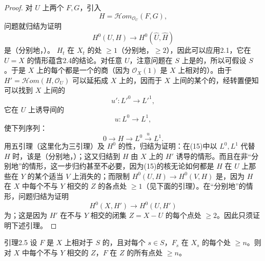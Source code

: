 \begin{proof}
对 $U$ 上两个 $F,G$，引入
\[
 H=\mathcal Hom_{\mathcal O_U}(F,G),
\]
问题就归结为证明
\[
 H^0(U,H)\longrightarrow H^0(\widehat U,\widehat H)\tag{15}
\]
是（分别地，）。 $H_t$ 在 $X_t$ 的处 $\geq1$（分别地，$\geq2$），因此可以应用2.1，它在 $U=X$ 的情形蕴含2.4的结论。对任意 $U$，注意问题在 $S$ 上是的，所以可假设 $S$ 。于是 $X$ 上的每个都是一个的商（因为 $\mathcal O_X(1)$ 是 $X$ 上相对的）。由于 $H'=\mathcal Hom(H,\mathcal O_U)$ 可以延拓成 $X$ 上的，因而于 $X$ 上间的某个的，经转置便知可以找到 $X$ 上间的
\[
 u':L'^0\longrightarrow L'^1,
\]
它在 $U$ 上诱导间的
\[
 u:L^0\longrightarrow L^1,
\]
使下列序列：
\[
 0\longrightarrow H\longrightarrow L^0\xrightarrow{u}L^1.
\]
用五引理（这里化为三引理）及 $H^0$ 的性，归结为证明：在(15)中以 $L^0,L^1$ 代替 $H$ 时，该是（分别地，）；这又归结到 $H$ 由 $X$ 上的 $H'$ 诱导的情形。而且在非“分别地”的情形，这一步归约甚至不必要，因为(15)的核无论如何都是 $H$ 在 $U$ 上那些在 $Y$ 的某个适当 $V$ 上消失的；而限制 $H^0(U,H)\to H^0(V,H)$ 是，因为 $H$ 在 $X$ 中每个不与 $Y$ 相交的 $Z$ 的各点处 $\geq1$（见下面的引理）。在“分别地”的情形，问题归结为证明
\[
 H^0(X,H')\longrightarrow H^0(U,H')
\]
为；这是因为 $H'$ 在不与 $Y$ 相交的闭集 $Z=X-U$ 的每个点处 $\geq2$。因此只须证明下述引理。
\end{proof}
\begin{SGAresult}{引理}{2.5}
设 $F$ 是 $X$ 上相对于 $S$ 的，且对每个 $s\in S$，$F_s$ 在 $X_s$ 的每个处 $\geq n$。则对 $X$ 中每个不与 $Y$ 相交的 $Z$，$F$ 在 $Z$ 的所有点处 $\geq n$。
\end{SGAresult}
